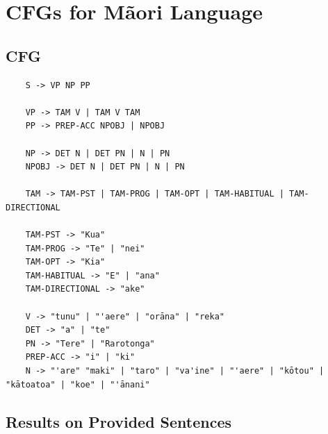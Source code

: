 \section{CFGs for M\~aori Language}

\subsection{CFG}

\begin{small}
  \begin{verbatim}
    S -> VP NP PP

    VP -> TAM V | TAM V TAM
    PP -> PREP-ACC NPOBJ | NPOBJ
    
    NP -> DET N | DET PN | N | PN
    NPOBJ -> DET N | DET PN | N | PN
    
    TAM -> TAM-PST | TAM-PROG | TAM-OPT | TAM-HABITUAL | TAM-DIRECTIONAL
    
    TAM-PST -> "Kua"
    TAM-PROG -> "Te" | "nei"
    TAM-OPT -> "Kia"
    TAM-HABITUAL -> "E" | "ana"
    TAM-DIRECTIONAL -> "ake"
    
    V -> "tunu" | "'aere" | "orāna" | "reka"
    DET -> "a" | "te"
    PN -> "Tere" | "Rarotonga"
    PREP-ACC -> "i" | "ki"
    N -> "'are" "maki" | "taro" | "va'ine" | "'aere" | "kōtou" | "kātoatoa" | "koe" | "'ānani"
  \end{verbatim}
\end{small}

\subsection{Results on Provided Sentences}


